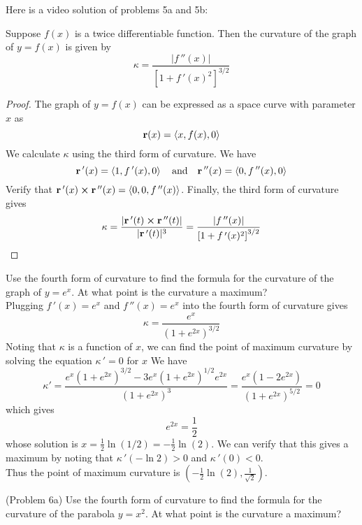 \documentclass[handout]{ximera}
\begin{document}
Here is a video solution of problems 5a and 5b:\\
\begin{foldable}
\end{foldable}


\begin{proposition}
Suppose $f(x)$ is a twice differentiable function. Then the curvature of the graph of $y = f(x)$ is given by
\[
\kappa = \frac{|f\,''(x)|}{\left[1+ f\,'(x)^2\right]^{3/2}}
\]
\end{proposition}

\begin{proof}
The graph of $y = f(x)$ can be expressed as a space curve with parameter $x$ as
\[
\mathbf r(x) = \left\langle x, f(x), 0\right\rangle
\]
We calculate $\kappa$ using the third form of curvature. We have
\[
\mathbf r\,'(x) = \left\langle 1, f\,'(x), 0\right\rangle \quad \text{and} \quad \mathbf r\,''(x) = \left\langle 0, f\,''(x), 0\right\rangle 
\]
Verify that $\mathbf r\,'(x) \boldsymbol\times \mathbf r\,''(x) = \left\langle 0,0,f\,''(x)\right\rangle$.
Finally, the third form of curvature gives
\[
\kappa = \frac{|\mathbf r\,'(t) \boldsymbol\times \mathbf r\,''(t)|}{|\mathbf r\,'(t)|^3} = \frac{|f\,''(x)|}{\left[1+ f\,'(x)^2\right]^{3/2}}
\]
\end{proof}

\begin{example}[Example 6]
Use the fourth form of curvature to find the formula for the curvature of the graph of $y = e^x$.  At what point is the curvature a maximum?\\
Plugging $f\,'(x) = e^x$ and $f\,''(x) = e^x$ into the fourth form of curvature gives
\[
\kappa = \frac{e^x}{(1+e^{2x})^{3/2}}
\]
Noting that $\kappa$ is a function of $x$, we can find the point of maximum curvature by solving the equation $\kappa\,' = 0$ for $x$
We have
\[
\kappa ' = \frac{e^x(1+e^{2x})^{3/2} - 3e^x(1+e^{2x})^{1/2}e^{2x}}{(1+e^{2x})^3} = \frac{e^x\left(1- 2e^{2x}\right)}{(1+e^{2x})^{5/2}} = 0
\]
which gives
\[
 e^{2x} = \frac12
\]
whose solution is $ x = \frac12 \ln(1/2) = -\frac12 \ln(2)$. We can verify that this gives a maximum by 
noting that  $\kappa \,' (-\ln 2) > 0$ and   $\kappa \,' (0) < 0$. \\
Thus the point of maximum curvature is $\left(-\frac12 \ln(2), \frac{1}{\sqrt 2}\right)$.
\end{example}

\begin{problem}(Problem 6a)
Use the fourth form of curvature to find the formula for the curvature of the parabola $y = x^2$.  At what point is the curvature a maximum?\\
\end{problem}
\end{document}
